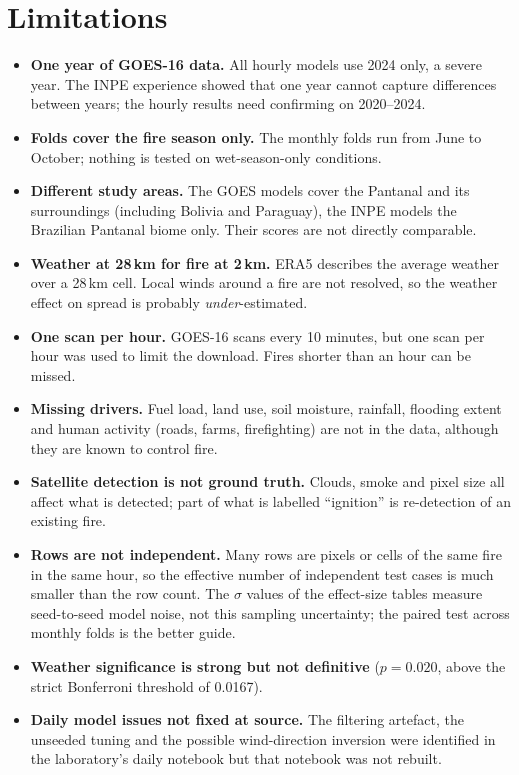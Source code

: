 \documentclass[11pt,a4paper,oneside]{report}
\newcommand{\sig}{\ensuremath{\sigma}}
\begin{document}
\chapter{Limitations}\label{ch:limits}

\begin{itemize}
  \item \textbf{One year of GOES-16 data.} All hourly models use 2024 only, a
        severe year. The INPE experience showed that one year cannot capture
        differences between years; the hourly results need confirming on
        2020--2024.
  \item \textbf{Folds cover the fire season only.} The monthly folds run from June
        to October; nothing is tested on wet-season-only conditions.
  \item \textbf{Different study areas.} The GOES models cover the Pantanal and its
        surroundings (including Bolivia and Paraguay), the INPE models the
        Brazilian Pantanal biome only. Their scores are not directly comparable.
  \item \textbf{Weather at 28\,km for fire at 2\,km.} ERA5 describes the average
        weather over a 28\,km cell. Local winds around a fire are not resolved, so
        the weather effect on spread is probably \emph{under}-estimated.
  \item \textbf{One scan per hour.} GOES-16 scans every 10 minutes, but one scan
        per hour was used to limit the download. Fires shorter than an hour can
        be missed.
  \item \textbf{Missing drivers.} Fuel load, land use, soil moisture, rainfall,
        flooding extent and human activity (roads, farms, firefighting) are not in
        the data, although they are known to control fire.
  \item \textbf{Satellite detection is not ground truth.} Clouds, smoke and pixel
        size all affect what is detected; part of what is labelled
        \enquote{ignition} is re-detection of an existing fire.
  \item \textbf{Rows are not independent.} Many rows are pixels or cells of the
        same fire in the same hour, so the effective number of independent test
        cases is much smaller than the row count. The \sig{} values of the
        effect-size tables measure seed-to-seed model noise, not this sampling
        uncertainty; the paired test across monthly folds is the better guide.
  \item \textbf{Weather significance is strong but not definitive}
        ($p=0.020$, above the strict Bonferroni threshold of 0.0167).
  \item \textbf{Daily model issues not fixed at source.} The filtering artefact,
        the unseeded tuning and the possible wind-direction inversion were
        identified in the laboratory's daily notebook but that notebook was not
        rebuilt.
\end{itemize}
\end{document}
